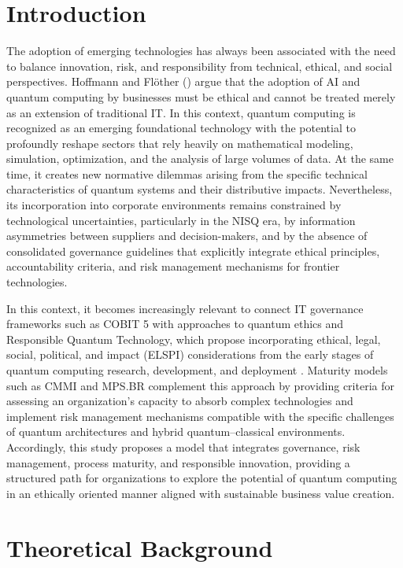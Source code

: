 \documentclass{icis}
\begin{document}
\section{Introduction}
The adoption of emerging technologies has always been associated with the need to balance innovation, risk, and responsibility from technical, ethical, and social perspectives. Hoffmann and Flöther (\citeyear{hoffmann2024}) argue that the adoption of AI and quantum computing by businesses must be ethical and cannot be treated merely as an extension of traditional IT. In this context, quantum computing is recognized as an emerging foundational technology with the potential to profoundly reshape sectors that rely heavily on mathematical modeling, simulation, optimization, and the analysis of large volumes of data. At the same time, it creates new normative dilemmas arising from the specific technical characteristics of quantum systems and their distributive impacts. Nevertheless, its incorporation into corporate environments remains constrained by technological uncertainties, particularly in the NISQ era, by information asymmetries between suppliers and decision-makers, and by the absence of consolidated governance guidelines that explicitly integrate ethical principles, accountability criteria, and risk management mechanisms for frontier technologies.

In this context, it becomes increasingly relevant to connect IT governance frameworks such as COBIT 5 with approaches to quantum ethics and Responsible Quantum Technology, which propose incorporating ethical, legal, social, political, and impact (ELSPI) considerations from the early stages of quantum computing research, development, and deployment \parencite{perrier2022,kop2024}. Maturity models such as CMMI and MPS.BR complement this approach by providing criteria for assessing an organization's capacity to absorb complex technologies and implement risk management mechanisms compatible with the specific challenges of quantum architectures and hybrid quantum--classical environments. Accordingly, this study proposes a model that integrates governance, risk management, process maturity, and responsible innovation, providing a structured path for organizations to explore the potential of quantum computing in an ethically oriented manner aligned with sustainable business value creation.

\section{Theoretical Background}
\end{document}
